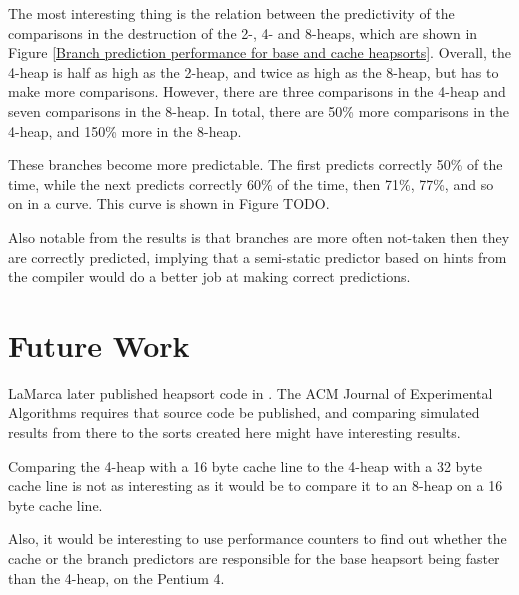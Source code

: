 The most interesting thing is the relation between the predictivity of the
comparisons in the destruction of the 2-, 4- and 8-heaps, which are shown in
Figure \ref{Branch prediction performance for base and cache heapsorts}.
Overall, the 4-heap is half as high as the 2-heap, and twice as high as the
8-heap, but has to make more comparisons. However, there are three comparisons
in the 4-heap and seven comparisons in the 8-heap. In total, there are 50\% more
comparisons in the 4-heap, and 150\% more in the 8-heap.

These branches become more predictable. The first predicts correctly 50\% of the
time, while the next predicts correctly 60\% of the time, then 71\%, 77\%, and
so on in a curve. This curve is shown in Figure TODO.

Also notable from the results is that branches are more often not-taken then
they are correctly predicted, implying that a semi-static predictor based on
hints from the compiler would do a better job at making correct predictions.

\section{Future Work}

LaMarca later published heapsort code in \cite{LaMarcaHeap96}. The ACM
Journal of Experimental Algorithms requires that source code be published, and
comparing simulated results from there to the sorts created here might have
interesting results.

Comparing the 4-heap with a 16 byte cache line to the 4-heap with a 32 byte
cache line is not as interesting as it would be to compare it to an 8-heap on a
16 byte cache line.

Also, it would be interesting to use performance counters to find out whether
the cache or the branch predictors are responsible for the base heapsort being
faster than the 4-heap, on the Pentium 4.

